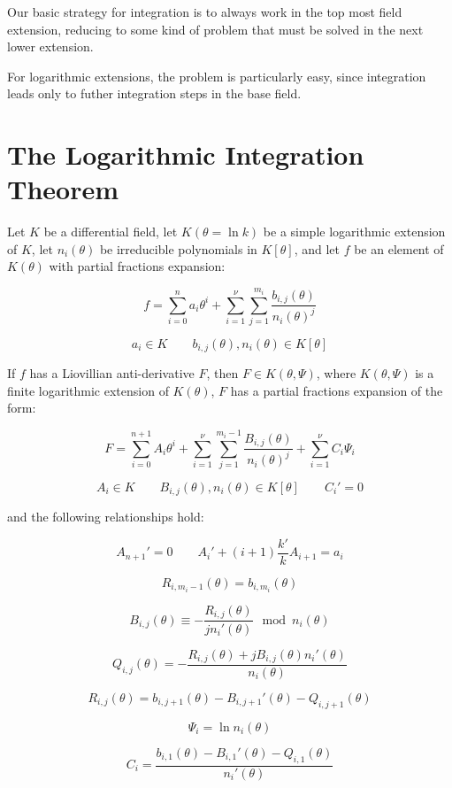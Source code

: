 

Our basic strategy for integration is to always work in the top most
field extension, reducing to some kind of problem that must be
solved in the next lower extension.

For logarithmic extensions, the problem is particularly easy,
since integration leads only to futher integration steps
in the base field.

\vfill\eject
\section{The Logarithmic Integration Theorem}

\theorem\label{logarithmic integration theorem}
Let $K$ be a differential field, let $K(\theta = \ln k)$ be a simple
logarithmic extension of $K$, let $n_i(\theta)$ be
irreducible polynomials in $K[\theta]$,
and let $f$ be an element of $K(\theta)$
with partial fractions expansion:

$$f = \sum_{i=0}^n a_i \theta^i
+ \sum_{i=1}^\nu \sum_{j=1}^{m_i} \frac{b_{i,j}(\theta)}{n_i(\theta)^j}$$

$$a_i \in K \qquad b_{i,j}(\theta),n_i(\theta) \in K[\theta]$$

If $f$ has
a Liovillian anti-derivative $F$, then $F \in K(\theta, \Psi)$,
where $K(\theta, \Psi)$ is a finite logarithmic extension
of $K(\theta)$, $F$ has a partial fractions expansion of the form:

$$F = \sum_{i=0}^{n+1} A_i \theta^i
+ \sum_{i=1}^\nu \sum_{j=1}^{m_i-1} \frac{B_{i,j}(\theta)}{n_i(\theta)^j}
+ \sum_{i=1}^\nu C_i \Psi_i$$

$$A_i \in K \qquad B_{i,j}(\theta),n_i(\theta) \in K[\theta] \qquad C_i' = 0$$

and the following relationships hold:

$$ A_{n+1}' = 0 \qquad A_i' + (i+1) \frac{k'}{k} A_{i+1} = a_i $$

$$ R_{i,m_i-1}(\theta) = b_{i,m_i}(\theta) $$

$$ B_{i,j}(\theta) \equiv - \frac{R_{i,j}(\theta)}{j n_i'(\theta) } \mod n_i(\theta)$$

$$ Q_{i,j}(\theta) = - \frac{R_{i,j}(\theta) + j B_{i,j}(\theta) n_i'(\theta)}{n_i(\theta)}$$

$$ R_{i,j}(\theta) = b_{i,j+1}(\theta) - B_{i,j+1}'(\theta) - Q_{i,j+1}(\theta) $$

$$ \Psi_i = \ln n_i(\theta)$$

$$ C_i = \frac{b_{i,1}(\theta) - B_{i,1}'(\theta) - Q_{i,1}(\theta)}{n_i'(\theta)} $$

